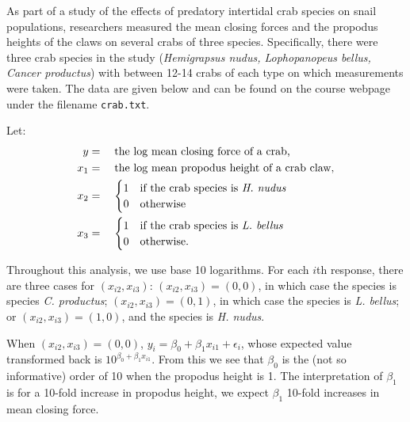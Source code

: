 \documentclass{homework}
\begin{document}
\begin{longproblem}
  As part of a study of the effects of predatory intertidal crab species on snail populations, researchers measured the mean closing forces and the propodus heights of the claws on several crabs of three species. Specifically, there were three crab species in the study (\emph{Hemigrapsus nudus, Lophopanopeus bellus, Cancer productus}) with between 12-14 crabs of each type on which measurements were taken.  The data are given below and can be found on the course webpage under the filename \texttt{crab.txt}.

  Let:
  \begin{align*}
    y   &=\quad \text{the log mean closing force of a crab,}\\
    x_1 &=\quad \text{the log mean propodus height of a crab claw,}\\
    x_2 &=\quad \begin{cases} 1&\text{if the crab species is \emph{H. nudus}}\\ 0 & \text{otherwise}\end{cases}\\
    x_3 &=\quad \begin{cases} 1&\text{if the crab species is \emph{L. bellus}}\\ 0 & \text{otherwise.}\end{cases}\\
  \end{align*}

  \begin{solution}
    Throughout this analysis, we use base 10 logarithms.
    For each $i$th response, there are three cases for
    $(x_{i2},x_{i3})$: $(x_{i2},x_{i3}) = (0,0)$, in which case the
    species is species \emph{C. productus}; $(x_{i2},x_{i3})=(0,1)$,
    in which case the species is \emph{L. bellus}; or
    $(x_{i2},x_{i3})=(1,0)$, and the species is \emph{H. nudus}.
    
    When  $(x_{i2},x_{i3})=(0,0)$, $y_i = \beta_0 + \beta_1x_{i1} +
    \epsilon_i$, whose expected value transformed back is $10^{\beta_0+ \beta_1
    x_{i1}}$.  From this we see that $\beta_0$ is the (not so informative)
    order of 10 when the propodus height is 1.  The interpretation of
    $\beta_1$ is for a 10-fold increase in propodus height, we expect
    $\beta_1$ 10-fold increases in mean closing force. 
    

\end{solution}
\end{longproblem}
\end{document}
